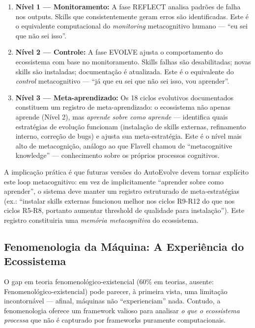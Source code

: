 \begin{enumerate}
  \item \textbf{Nível 1 --- Monitoramento:} A fase REFLECT analisa padrões de falha nos outputs. Skills que consistentemente geram erros são identificadas. Este é o equivalente computacional do \textit{monitoring} metacognitivo humano --- ``eu sei que não sei isso''.
  \item \textbf{Nível 2 --- Controle:} A fase EVOLVE ajusta o comportamento do ecossistema com base no monitoramento. Skills falhas são desabilitadas; novas skills são instaladas; documentação é atualizada. Este é o equivalente do \textit{control} metacognitivo --- ``já que eu sei que não sei isso, vou aprender''.
  \item \textbf{Nível 3 --- Meta-aprendizado:} Os 18 ciclos evolutivos documentados constituem um registro de meta-aprendizado: o ecossistema não apenas aprende (Nível 2), mas \textit{aprende sobre como aprende} --- identifica quais estratégias de evolução funcionam (instalação de skills externas, refinamento interno, correção de bugs) e ajusta sua meta-estratégia. Este é o nível mais alto de metacognição, análogo ao que Flavell chamou de ``metacognitive knowledge'' --- conhecimento sobre os próprios processos cognitivos.
\end{enumerate}

A implicação prática é que futuras versões do AutoEvolve devem tornar explícito este loop metacognitivo: em vez de implicitamente ``aprender sobre como aprender'', o sistema deve manter um registro estruturado de meta-estratégias (ex.: ``instalar skills externas funcionou melhor nos ciclos R9-R12 do que nos ciclos R5-R8, portanto aumentar threshold de qualidade para instalação''). Este registro constituiria uma \textit{memória metacognitiva} do ecossistema.

\subsection{Fenomenologia da Máquina: A Experiência do Ecossistema}

O gap em teoria fenomenológico-existencial (60\% em teorias, ausente: Fenomenológico-existencial) pode parecer, à primeira vista, uma limitação incontornável --- afinal, máquinas não ``experienciam'' nada. Contudo, a fenomenologia oferece um framework valioso para analisar \textit{o que o ecossistema processa} que não é capturado por frameworks puramente computacionais.

